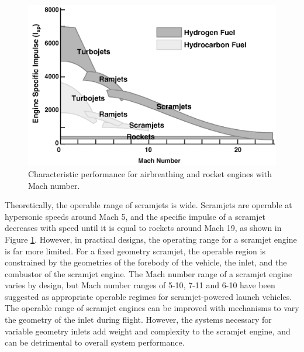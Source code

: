     \begin{figure}[ht]
    	\centering
    	\includegraphics[width=0.7\linewidth]{figures/2_literature-review/Scramjet-Efficiency}
    	\caption{Characteristic performance for airbreathing and rocket engines with Mach number\cite{Fry2004}.}
    	\label{fig:Scramjet-Efficiency}
    \end{figure}
    
    Theoretically, the operable range of scramjets is wide\cite{Smart2007a}. Scramjets are operable at hypersonic speeds around Mach 5, and the specific impulse of a scramjet decreases with speed until it is equal to rockets around Mach 19\cite{Fry2004}, as shown in Figure \ref{fig:Scramjet-Efficiency}. 
    However, in practical designs, the operating range for a scramjet engine is far more limited. 
    For a fixed geometry scramjet, the operable region is constrained by the geometries of the forebody of the vehicle, the inlet, and the combustor of the scramjet engine\cite{Smart2010}.  
    The Mach number range of a scramjet engine varies by design, but Mach number ranges of 5-10\cite{Preller2017b}, 7-11\cite{Dalle2014} and 6-10\cite{Bradford2000} have been suggested as appropriate operable regimes for scramjet-powered launch vehicles.
    The operable range of scramjet engines can be improved with mechanisms to vary the geometry of the inlet during flight\cite{Dalle2011}. However, the systems necessary for variable geometry inlets add weight and complexity to the scramjet engine, and can be detrimental to overall system performance\cite{Smart2010}. 
    
